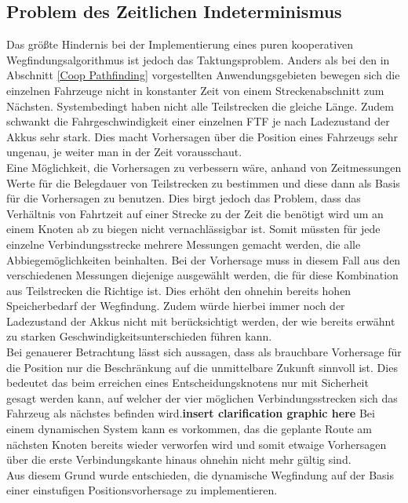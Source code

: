 	\subsection{Problem des Zeitlichen Indeterminismus}
		\label{Zeitproblem}
		Das größte Hindernis bei der Implementierung eines puren kooperativen Wegfindungsalgorithmus ist jedoch das Taktungsproblem. Anders als bei den in Abschnitt \ref{Coop Pathfinding} vorgestellten Anwendungsgebieten bewegen sich die einzelnen Fahrzeuge nicht in konstanter Zeit von einem Streckenabschnitt zum Nächsten. Systembedingt haben nicht alle Teilstrecken die gleiche Länge. Zudem schwankt die Fahrgeschwindigkeit einer einzelnen \ac{FTF} je nach Ladezustand der Akkus sehr stark. Dies macht Vorhersagen über die Position eines Fahrzeugs sehr ungenau, je weiter man in der Zeit vorausschaut.
		\\
		Eine Möglichkeit, die Vorhersagen zu verbessern wäre, anhand von Zeitmessungen Werte für die Belegdauer von Teilstrecken zu bestimmen und diese dann als Basis für die Vorhersagen zu benutzen. Dies birgt jedoch das Problem, dass das Verhältnis von Fahrtzeit auf einer Strecke zu der Zeit die benötigt wird um an einem Knoten ab zu biegen nicht vernachlässigbar ist. Somit müssten für jede einzelne Verbindungsstrecke mehrere Messungen gemacht werden, die alle Abbiegemöglichkeiten beinhalten. Bei der Vorhersage muss in diesem Fall aus den verschiedenen Messungen diejenige ausgewählt werden, die für diese Kombination aus Teilstrecken die Richtige ist. Dies erhöht den ohnehin bereits hohen Speicherbedarf der Wegfindung. Zudem würde hierbei immer noch der Ladezustand der Akkus nicht mit berücksichtigt werden, der wie bereits erwähnt zu starken Geschwindigkeitsunterschieden führen kann.
		\\
		Bei genauerer Betrachtung lässt sich aussagen, dass als brauchbare Vorhersage für die Position nur die Beschränkung auf die unmittelbare Zukunft sinnvoll ist. Dies bedeutet das beim erreichen eines Entscheidungsknotens nur mit Sicherheit gesagt werden kann, auf welcher der vier möglichen Verbindungsstrecken sich das Fahrzeug als nächstes befinden wird.\textbf{insert clarification graphic here} Bei einem dynamischen System kann es vorkommen, das die geplante Route am nächsten Knoten bereits wieder verworfen wird und somit etwaige Vorhersagen über die erste Verbindungskante hinaus ohnehin nicht mehr gültig sind.
		\\
		Aus diesem Grund wurde entschieden, die dynamische Wegfindung auf der Basis einer einstufigen Positionsvorhersage zu implementieren.
		

